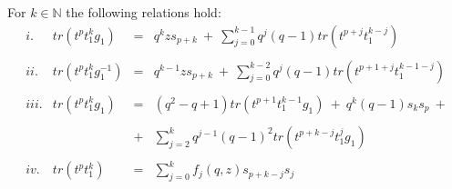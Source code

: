 \documentclass[10pt,a4paper]{amsart}
\begin{document}
\begin{lemma}\label{newlem}
For $k \in \mathbb{N}$ the following relations hold:
\[
\begin{array}{llll}
i. & tr(t^pt_1^kg_1) & = & q^k z s_{p+k}\ + \ \sum_{j=0}^{k-1}{q^j(q-1)tr(t^{p+j}t_1^{k-j})} \\
&&&\\
ii. & tr(t^pt_1^kg_1^{-1}) & = & q^{k-1} z s_{p+k}\ +\ \sum_{j=0}^{k-2}{q^j(q-1)tr(t^{p+1+j}t_1^{k-1-j})} \\
&&&\\
iii. & tr(t^pt_1^kg_1) & = & (q^2-q+1)tr(t^{p+1}t_1^{k-1}g_1)\ +\  q^k(q-1)s_ks_p\ +\\
&&&\\
&& + & \sum_{j=2}^{k}{q^{j-1}(q-1)^2tr(t^{p+k-j}t_1^{j}g_1)}\\
&&&\\
iv. & tr(t^pt_1^k) & = & \sum_{j=0}^{k}{f_j(q,z)s_{p+k-j}s_{j}}
\end{array}
\]
\end{lemma}
\end{document}
